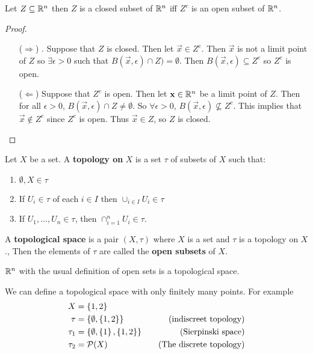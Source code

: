 \documentclass[12pt, twosided]{article}
\begin{document}
\begin{prop}
  Let \(Z \subseteq \mathbb{R}^n\) then \(Z\) is a closed subset of \(\mathbb{R}^n\) iff \(Z^c\) is an open subset of \(\mathbb{R}^n\).
\end{prop}
\begin{proof}
  \begin{enumerate}
  \item [(\(\Rightarrow\))]. Suppose that \(Z\) is closed. Then let \(\vec{x} \in Z^c\). Then \(\vec{x}\) is not a limit point of \(Z\) so \(\exists \epsilon > 0\) such that \(B(\vec{x}, \epsilon) \cap Z) = \emptyset.\) Then \(B(\vec{x}, \epsilon) \subseteq Z^c\) so \(Z^c\) is open.
  \item [(\(\Leftarrow\))] Suppose that \(Z^c\)  is open. Then let \(\mathbf{x} \in \mathbb{R}^n\) be a limit point of \(Z\). Then for all \(\epsilon > 0\), \(B(\vec{x}, \epsilon) \cap Z \neq \emptyset\). So \(\forall \epsilon > 0\), \(B(\vec{x}, \epsilon) \not\subseteq Z^c\). This implies that \(\vec{x} \not\in Z^c\) since \(Z^c\) is open. Thus \(\vec{x} \in Z\), so \(Z\) is closed.
  \end{enumerate}
\end{proof}
\begin{df}
  Let \(X\) be a set. A \textbf{topology on} \(X\) is a set \(\tau\) of subsets 
of \(X\) such that:
\begin{enumerate}
  \item \(\emptyset, X \in \tau\)
  \item If \(U_i \in \tau\) of each \(i \in I\) then \(\cup_{i \in I} U_i \in \tau\)
  \item If \(U_1, \ldots, U_n \in \tau\), then \(\cap_{i = 1}^n U_i \in \tau\).
  \end{enumerate}
    A \textbf{topological space} is a pair \((X, \tau)\) where \(X\) is a set and \(\tau\) is a topology on \(X\)., Then the elements of \(\tau\) are called the \textbf{open subsets} of \(X\).

\end{df}
\begin{exa}
  \(\mathbb{R}^n\) with the usual definition of open sets is a topological space.
\end{exa}

\begin{exa}
  We can define a topological space with only finitely many points. For example
  \begin{align*}
    X &= \left\{ 1, 2 \right\} \\
    \tau &= \left\{ \emptyset, \left\{ 1, 2 \right\} \right\} \quad &\text{(indiscreet topology)}\\
    \tau_1 &= \left\{ \emptyset, \left\{ 1 \right\}, \left\{ 1, 2 \right\} \right\} \quad &\text{(Sierpinski space)} \\
    \tau_2 &= \mathcal{P}(X) \quad &\text{(The discrete topology)}
  \end{align*}
\end{exa}
\end{document}
